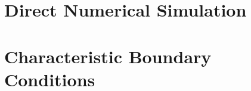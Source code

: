 \section{Direct Numerical Simulation}

\cite{orszag1970AnalyticalTheoriesTurbulence, domingo2023RecentDevelopmentsDNS, chen2011PetascaleDirectNumerical, yang2015LargeeddySimulationPresent, veynante2002TurbulentCombustionModeling, moin1998DirectNumericalSimulation, tennekes1972FirstCourseTurbulence}








\section{Characteristic Boundary Conditions}

